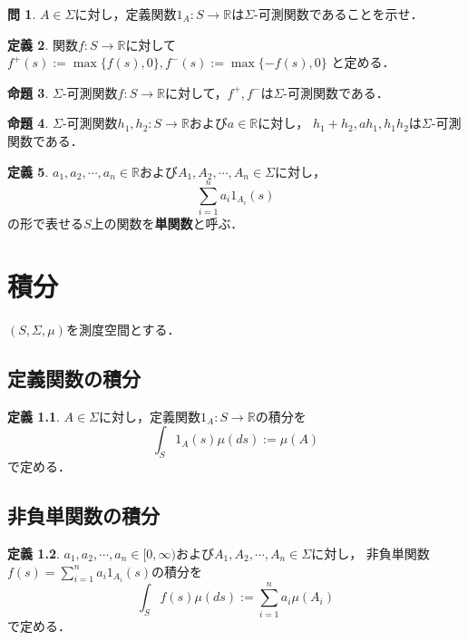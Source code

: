 \documentclass{jsreport}
\theoremstyle{definition}
\newtheorem{defi}{定義}[section]
\newtheorem{prop}[defi]{命題}
\newtheorem{qst}[defi]{問}
\begin{document}
\begin{qst}\label{qst_indicator_function_is_measurable}
$A\in\Sigma$に対し，定義関数$1_A \colon S\to\mathbb{R}$は$\Sigma$-可測関数であることを示せ．
\end{qst}

\begin{defi}\label{def_positive_and_negative_part}
関数$f \colon S\to\mathbb{R}$に対して
$f^+(s):=\max\{f(s),0\}, f^-(s):=\max\{-f(s),0\}$
と定める．
\end{defi}

\begin{prop}\label{prop_positive_and_negative_part_are_measurable}
$\Sigma$-可測関数$f \colon S\to\mathbb{R}$に対して，$f^+,f^-$は$\Sigma$-可測関数である．
\end{prop}

\begin{prop}\label{prop_measurable_function_and_arithmetic}
$\Sigma$-可測関数$h_1,h_2 \colon S\to\mathbb{R}$および$a\in\mathbb{R}$に対し，
$h_1+h_2, ah_1, h_1h_2$は$\Sigma$-可測関数である．
\end{prop}

\begin{defi}\label{def_simple_function}
$a_1,a_2,\cdots,a_n\in\mathbb{R}$および$A_1,A_2,\cdots,A_n\in\Sigma$に対し，
\[ \sum_{i=1}^n a_i1_{A_i}(s) \]
の形で表せる$S$上の関数を\textbf{単関数}と呼ぶ．
\end{defi}

\chapter{積分}

$(S,\Sigma,\mu)$を測度空間とする．

\section{定義関数の積分}

\begin{defi}\label{def_indicator_function_integral}
$A\in\Sigma$に対し，定義関数$1_A \colon S\to\mathbb{R}$の積分を
\[ \int_S 1_A(s)\mu(ds):=\mu(A) \]
で定める．
\end{defi}

\section{非負単関数の積分}

\begin{defi}\label{def_nonnegative_simple_function_integral}
$a_1,a_2,\cdots,a_n\in[0,\infty)$および$A_1,A_2,\cdots,A_n\in\Sigma$に対し，
非負単関数$f(s)=\displaystyle\sum_{i=1}^n a_i1_{A_i}(s)$の積分を
\[ \int_S f(s)\mu(ds):=\sum_{i=1}^n a_i\mu(A_i) \]
で定める．
\end{defi}
\end{document}
